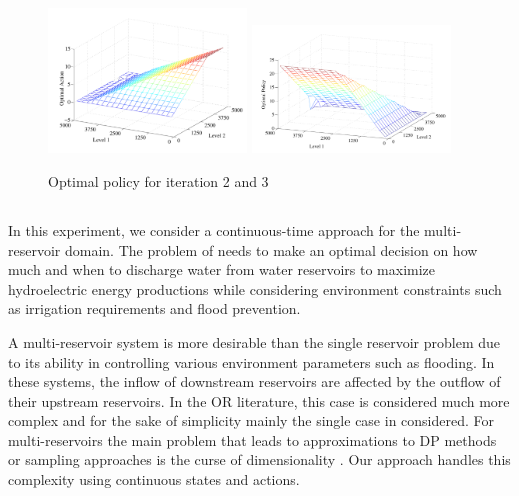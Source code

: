 \begin{figure}[t]
\centering
\includegraphics[width=0.47\textwidth]{Figures1/reservoir/policy-iteration2.pdf}
\includegraphics[width=0.47\textwidth]{Figures1/reservoir/policy-iteration3.pdf}
\caption{%
Optimal policy for iteration 2 and 3
}
\label{fig:policyplots}
\end{figure}
\subsection{\WaterReservoir}

In this experiment, we consider a continuous-time approach for the multi-reservoir domain.  
The problem of \WaterReservoir  needs to make an optimal decision on how much and when to discharge water from water reservoirs to maximize hydroelectric energy productions while considering environment constraints such as irrigation requirements and flood prevention. 

A multi-reservoir system is more desirable than the single reservoir problem due to its ability in controlling various environment parameters such as flooding.  In these systems, the inflow of downstream reservoirs are affected by the outflow of their upstream reservoirs. In the OR literature, this case  is considered much more complex and for the sake of simplicity mainly the single case in considered. For multi-reservoirs the main problem that leads to approximations to DP methods or sampling approaches is the curse of dimensionality \cite{Mahootchi2009}. Our approach handles this complexity using continuous states and actions.

